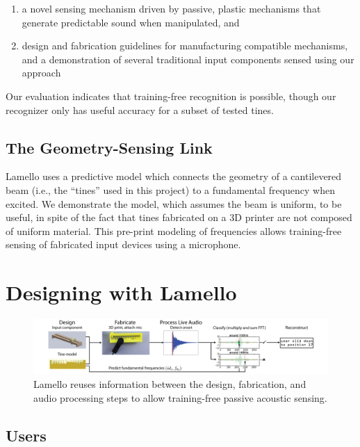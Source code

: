 \begin{enumerate}
\item a novel sensing mechanism driven by passive, plastic mechanisms that generate predictable sound when manipulated, and
\item design and fabrication guidelines for manufacturing compatible mechanisms, and a demonstration of several traditional input components sensed using our approach
\end{enumerate}

Our evaluation indicates that training-free recognition is possible, though our recognizer only has useful accuracy for a subset of tested tines.

    \subsection{The Geometry-Sensing Link}
    Lamello uses a predictive model which connects the geometry of a cantilevered beam (i.e., the ``tines'' used in this project) to a fundamental frequency when excited. We demonstrate the model, which assumes the beam is uniform, to be useful, in spite of the fact that tines fabricated on a 3D printer are not composed of uniform material. This pre-print modeling of frequencies allows training-free sensing of fabricated input devices using a microphone.
    
\section{Designing with Lamello}

\begin{figure}[t]
  \centering
    \includegraphics[width=\textwidth]{figures/lamello/systemdiagram-bh.png}
  \caption{Lamello reuses information between the design, fabrication, and audio processing steps to allow training-free passive acoustic sensing.}
  \label{fig:lamello-system}
  \vspace{-0.1in}
\end{figure}

    \subsection{Users}
    
